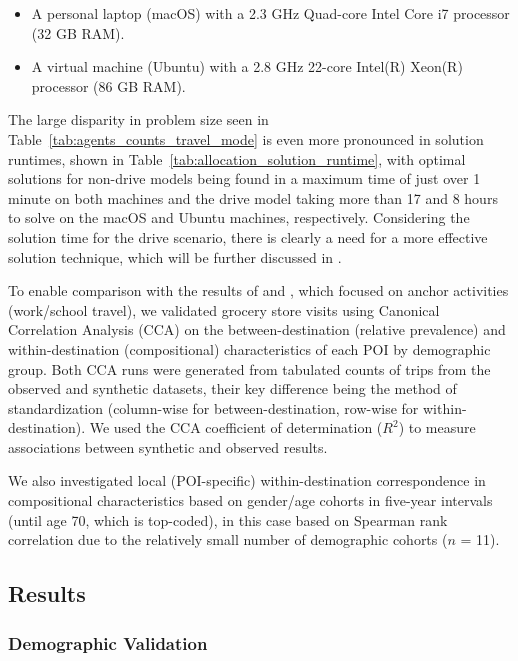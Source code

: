 \begin{itemize}
    \item A personal laptop (macOS) with a 2.3 GHz Quad-core Intel Core i7 processor (32 GB RAM).
    \item A virtual machine (Ubuntu) with a 2.8 GHz 22-core Intel(R) Xeon(R) processor (86 GB RAM).
\end{itemize}
    
The large disparity in problem size seen in Table~\ref{tab:agents_counts_travel_mode} is even more pronounced in solution runtimes, shown in Table~\ref{tab:allocation_solution_runtime}, with optimal solutions for non-drive models being found in a maximum time of just over 1 minute on both machines and the drive model taking more than 17 and 8 hours to solve on the macOS and Ubuntu machines, respectively. Considering the solution time for the drive scenario, there is clearly a need for a more effective solution technique, which will be further discussed in .



To enable comparison with the results of \cite{likeness-scipy-paper-2022} and \cite{urbanpop-AG-2023}, which focused on anchor activities (work/school travel), we validated grocery store visits using Canonical Correlation Analysis (CCA) on the between-destination (relative prevalence) and within-destination (compositional) characteristics of each POI by demographic group. Both CCA runs were generated from tabulated counts of trips from the observed and synthetic datasets, their key difference being the method of standardization (column-wise for between-destination, row-wise for within-destination). We used the CCA coefficient of determination ($R^2$) to measure associations between synthetic and observed results. 

We also investigated local (POI-specific) within-destination correspondence in compositional characteristics based on gender/age cohorts in five-year intervals (until age 70, which is top-coded), in this case based on Spearman rank correlation due to the relatively small number of demographic cohorts ($n$ = 11).

\subsection{Results}\label{section:results}

\subsubsection{Demographic Validation}

